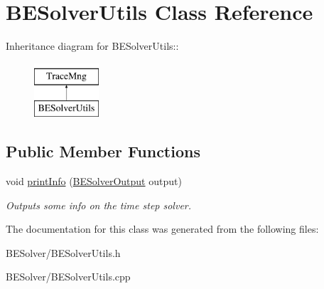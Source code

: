 \hypertarget{classBESolverUtils}{
\section{BESolverUtils Class Reference}
\label{classBESolverUtils}
}
Inheritance diagram for BESolverUtils::\begin{figure}[H]
\begin{center}
\leavevmode
\includegraphics[height=2cm]{classBESolverUtils}
\end{center}
\end{figure}
\subsection*{Public Member Functions}
\begin{DoxyCompactItemize}
\item 
\hypertarget{classBESolverUtils_a4229f6f6ac615a46c073c3359f1e1150}{
void \hyperlink{classBESolverUtils_a4229f6f6ac615a46c073c3359f1e1150}{printInfo} (\hyperlink{classBESolverOutput}{BESolverOutput} output)}
\label{classBESolverUtils_a4229f6f6ac615a46c073c3359f1e1150}

\begin{DoxyCompactList}\small\item\em Outputs some info on the time step solver. \item\end{DoxyCompactList}\end{DoxyCompactItemize}


The documentation for this class was generated from the following files:\begin{DoxyCompactItemize}
\item 
BESolver/BESolverUtils.h\item 
BESolver/BESolverUtils.cpp\end{DoxyCompactItemize}

